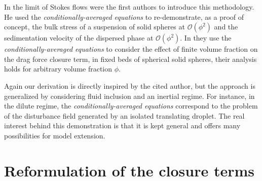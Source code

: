 In the limit of Stokes flows \citet{hinch1977averaged} were the first authors to introduce this methodology.
He used the \textit{conditionally-averaged equations} to re-demonstrate, as a proof of concept, the bulk stress of a suspension of solid spheres at $\mathcal{O}(\phi^2)$ and the sedimentation velocity of the dispersed phase at $\mathcal{O}(\phi^2)$. 
In \citet{kim1985modelling} they use the \textit{conditionally-averaged equations} to consider the effect of finite volume fraction on the drag force closure term, in fixed beds of spherical solid spheres, their analysis holds for arbitrary volume fraction $\phi$. 

Again our derivation is directly inspired by the cited author, but the approach is generalized by considering fluid inclusion and an inertial regime. 
For instance, in the dilute regime, the \textit{conditionally-averaged equations} correspond to the problem of the disturbance field generated by an isolated translating droplet. 
The real interest behind this demonstration is that it is kept general and offers many possibilities for model extension.
 






\section{Reformulation of the closure terms}
\label{sec:reformulation}


